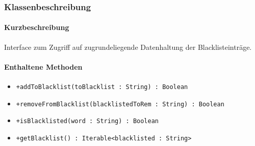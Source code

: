 \subsubsection*{Klassenbeschreibung}%
\paragraph*{Kurzbeschreibung}
Interface zum Zugriff auf zugrundeliegende Datenhaltung der Blacklisteinträge.
\paragraph*{Enthaltene Methoden}
\begin{itemize}
    \item \texttt{+addToBlacklist(toBlacklist : String) : Boolean}
    \item \texttt{+removeFromBlacklist(blacklistedToRem : String) : Boolean}
    \item \texttt{+isBlacklisted(word : String) : Boolean}
    \item \texttt{+getBlacklist() : Iterable<blacklisted : String>}
\end{itemize}
